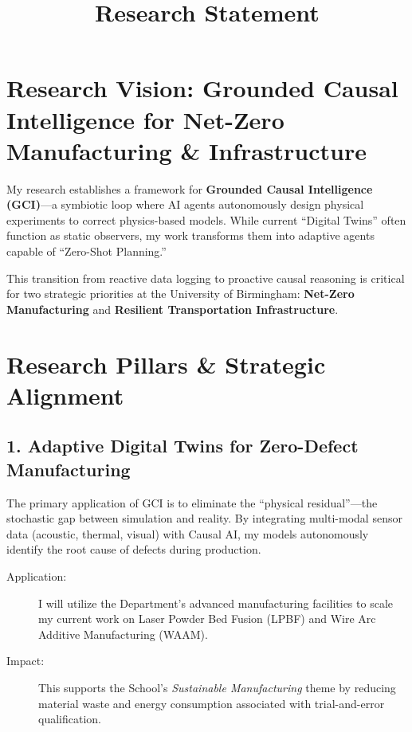 \documentclass[10pt, a4paper]{article}
\title{\textbf{Research Statement}}
\author{}
\date{}
\begin{document}
\maketitle
\vspace{-2em} %

\section*{Research Vision: Grounded Causal Intelligence for Net-Zero Manufacturing \& Infrastructure}

My research establishes a framework for \textbf{Grounded Causal Intelligence (GCI)}---a symbiotic loop where AI agents autonomously design physical experiments to correct physics-based models. While current ``Digital Twins'' often function as static observers, my work transforms them into adaptive agents capable of ``Zero-Shot Planning.'' 

This transition from reactive data logging to proactive causal reasoning is critical for two strategic priorities at the University of Birmingham: \textbf{Net-Zero Manufacturing} and \textbf{Resilient Transportation Infrastructure}.

\section*{Research Pillars \& Strategic Alignment}

\subsection*{1. Adaptive Digital Twins for Zero-Defect Manufacturing}
The primary application of GCI is to eliminate the ``physical residual''---the stochastic gap between simulation and reality. By integrating multi-modal sensor data (acoustic, thermal, visual) with Causal AI, my models autonomously identify the root cause of defects during production.

\begin{description}
    \item[Application:] I will utilize the Department’s advanced manufacturing facilities to scale my current work on Laser Powder Bed Fusion (LPBF) and Wire Arc Additive Manufacturing (WAAM).
    \item[Impact:] This supports the School’s \textit{Sustainable Manufacturing} theme by reducing material waste and energy consumption associated with trial-and-error qualification.
\end{description}
\end{document}
